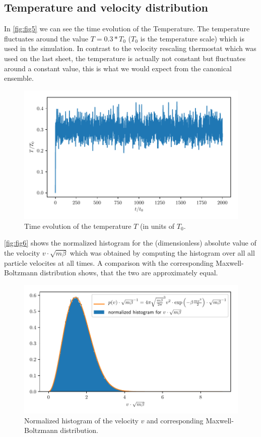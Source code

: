 \documentclass[a4paper,10pt,bibtotoc]{scrartcl}
\begin{document}
\subsection{Temperature and velocity distribution}
In \autoref{fig:fig5} we can see the time evolution of the Temperature.
The temperature fluctuates around the value $T=0.3*T_0$ ($T_0$ is the temperature scale) which is used in the simulation. 
In contrast to the velocity rescaling thermostat which was used on the last sheet, the temperature is actually not constant but fluctuates around a constant value, this is what we would expect from the canonical ensemble.
\begin{figure}[H]
	\centering
	\includegraphics[width=\linewidth]{temperature.pdf}
	\caption{Time evolution of the temperature $T$ (in units of $T_0$.}
	\label{fig:fig5}
\end{figure}
\autoref{fig:fig6} shows the normalized histogram for the (dimensionless) absolute value of the velocity $v\cdot \sqrt{m\beta}$ which was obtained by computing the histogram over all all particle velocites at all times.
A comparison with the corresponding Maxwell-Boltzmann distribution shows, that the two are approximately equal.
\begin{figure}[H]
	\centering
	\includegraphics[width=\linewidth]{maxwell_boltzmann_langevin.pdf}
	\caption{Normalized histogram of the velocity $v$ and corresponding Maxwell-Boltzmann distribution.}
	\label{fig:fig6}
\end{figure}
\end{document}
